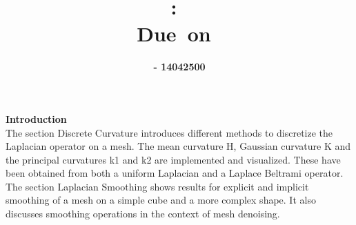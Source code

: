 \documentclass{article}
\title{
\vspace{2in}
\textmd{\textbf{\hmwkClass:\ \hmwkTitle}}\\
\normalsize\vspace{0.1in}\small{Due\ on\ \hmwkDueDate}\\
\vspace{3in}
}
\author{\textbf{\hmwkAuthorName  - 14042500}}
\date{} %
\begin{document}
\maketitle



\newpage

\textbf{Introduction}\\

The section Discrete Curvature introduces different methods to discretize the Laplacian operator on a mesh. The mean curvature H, Gaussian curvature K and the principal curvatures k1 and k2 are implemented and visualized. These have been obtained from both a uniform Laplacian and a Laplace Beltrami operator.\\


The section Laplacian Smoothing shows results for explicit and implicit smoothing of a mesh on a simple cube and a more complex shape. It also discusses smoothing operations in the context of mesh denoising.



\end{document}

